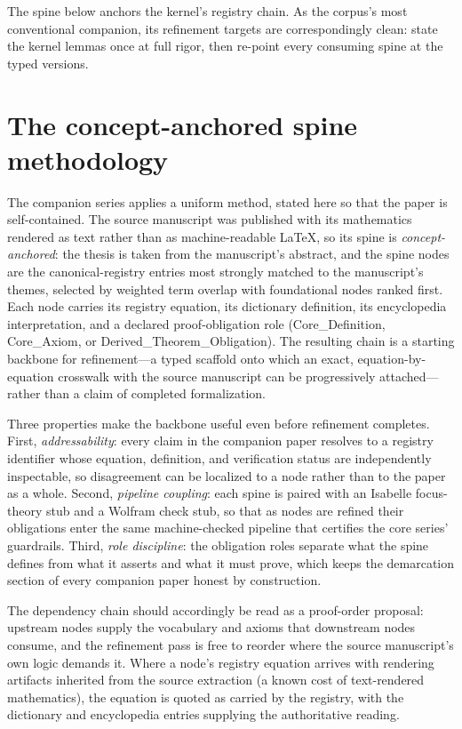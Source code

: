 \documentclass[11pt]{article}
\theoremstyle{remark}
\begin{document}
The spine below anchors the kernel's registry chain. As the corpus's most conventional companion, its refinement targets are correspondingly clean: state the kernel lemmas once at full rigor, then re-point every consuming spine at the typed versions.

\section{The concept-anchored spine methodology}
\label{sec:method}

The companion series applies a uniform method, stated here so that the paper is self-contained. The source manuscript was published with its mathematics rendered as text rather than as machine-readable LaTeX, so its spine is \emph{concept-anchored}: the thesis is taken from the manuscript's abstract, and the spine nodes are the canonical-registry entries most strongly matched to the manuscript's themes, selected by weighted term overlap with foundational nodes ranked first. Each node carries its registry equation, its dictionary definition, its encyclopedia interpretation, and a declared proof-obligation role (Core\_Definition, Core\_Axiom, or Derived\_Theorem\_Obligation). The resulting chain is a starting backbone for refinement---a typed scaffold onto which an exact, equation-by-equation crosswalk with the source manuscript can be progressively attached---rather than a claim of completed formalization.

Three properties make the backbone useful even before refinement completes. First, \emph{addressability}: every claim in the companion paper resolves to a registry identifier whose equation, definition, and verification status are independently inspectable, so disagreement can be localized to a node rather than to the paper as a whole. Second, \emph{pipeline coupling}: each spine is paired with an Isabelle focus-theory stub and a Wolfram check stub, so that as nodes are refined their obligations enter the same machine-checked pipeline that certifies the core series' guardrails. Third, \emph{role discipline}: the obligation roles separate what the spine defines from what it asserts and what it must prove, which keeps the demarcation section of every companion paper honest by construction.

The dependency chain should accordingly be read as a proof-order proposal: upstream nodes supply the vocabulary and axioms that downstream nodes consume, and the refinement pass is free to reorder where the source manuscript's own logic demands it. Where a node's registry equation arrives with rendering artifacts inherited from the source extraction (a known cost of text-rendered mathematics), the equation is quoted as carried by the registry, with the dictionary and encyclopedia entries supplying the authoritative reading.
\end{document}
